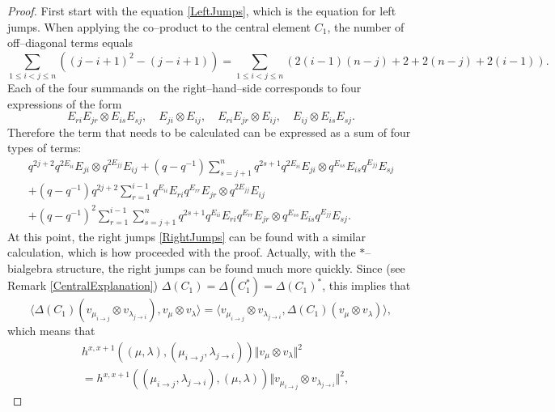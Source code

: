 \documentclass{ximera}
\begin{document}
\begin{proof}
First start with the equation \eqref{LeftJumps}, which is the equation for left jumps. When applying the co--product to the central element $C_1$, the number of off--diagonal terms equals
\begin{equation*}
\sum_{1 \leq i<j \leq n}\left((j-i+1)^{2}-(j-i+1)\right)=\sum_{1 \leq i<j \leq n}(2(i-1)(n-j)+2+2(n-j)+2(i-1)).
\end{equation*}
Each of the four summands on the right--hand--side corresponds to four expressions of the form
\begin{equation}
E_{r i} E_{j r} \otimes E_{i s} E_{s j}, \quad E_{ji} \otimes E_{ij}, \quad  E_{ri} E_{jr} \otimes E_{ij}, \quad E_{ij} \otimes E_{is} E_{sj}.
\end{equation}
Therefore the term that needs to be calculated can be expressed as a sum of four types of terms:
\begin{multline*}
q^{2 j+2} q^{2 E_{i i}} E_{j i} \otimes q^{2 E_{j j}} E_{i j}+\left(q-q^{-1}\right) \sum_{s=j+1}^{n} q^{2 s+1} q^{2 E_{i i}} E_{j i} \otimes q^{E_{s s}} E_{i s} q^{E_{j j}} E_{s j} \\ +\left(q-q^{-1}\right) q^{2 j+2} \sum_{r=1}^{i-1} q^{E_{i i}} E_{r i} q^{E_{r r}} E_{j r} \otimes q^{2 E_{j j}} E_{i j}\\
+\left(q-q^{-1}\right)^{2} \sum_{r=1}^{i-1} \sum_{s=j+1}^{n} q^{2 s+1} q^{E_{i i}} E_{r i} q^{E_{r r}} E_{j r} \otimes q^{E_{s s}} E_{i s} q^{E_{j j}} E_{s j}.
\end{multline*}
At this point, the right jumps \eqref{RightJumps} can be found with a similar calculation, which is how \cite{Kuan-IMRN} proceeded with the proof. Actually, with the $*$--bialgebra structure, the right jumps can be found much more quickly.  Since  (see Remark \ref{CentralExplanation}) $\Delta(C_1) = \Delta(C_1^*)=\Delta(C_1)^*$, this implies that
$$
\langle \Delta(C_1) (v_{\mu_{ i \rightarrow j}} \otimes v_{\lambda_{j \rightarrow i}}), v_{\mu}\otimes v_{\lambda} \rangle = \langle v_{\mu_{i \rightarrow j}} \otimes v_{\lambda_{j \rightarrow i}}, \Delta(C_1)(v_{\mu} \otimes v_{\lambda})\rangle ,
$$
which means that
\begin{align*}
&h^{x, x+1}\left((\mu, \lambda), \left(\mu_{i \rightarrow j}, \lambda_{j \rightarrow i}\right)\right) {   \Vert v_{\mu}\otimes v_{\lambda}\Vert^2}  \\& = h^{x, x+1}\left(\left(\mu_{i \rightarrow j}, \lambda_{j \rightarrow i}\right),(\mu, \lambda)\right) { \Vert v_{\mu_{i\rightarrow j}} \otimes v_{\lambda_{j \rightarrow i}} \Vert^2},  
\end{align*}

\end{proof}
\end{document}
